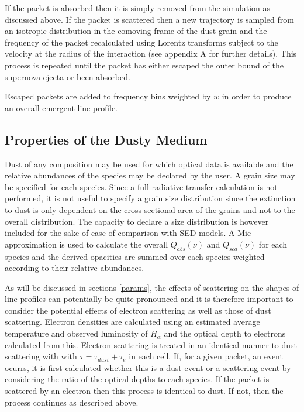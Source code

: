 \documentclass[useAMS,usenatbib,usegraphicx]{mnras}
\begin{document}
If the packet is absorbed then it is simply removed from the simulation as discussed above.  If the packet is scattered then a new trajectory is sampled from an isotropic distribution in the comoving frame of the dust grain and the frequency of the packet recalculated using Lorentz transforms subject to the velocity at the radius of the interaction (see appendix A for further details).  This process is repeated until the packet has either escaped the outer bound of the supernova ejecta or been absorbed.
   
Escaped packets are added to frequency bins weighted by $w$ in order to produce an overall emergent line profile.



\subsection{Properties of the Dusty Medium}

Dust of any composition may be used for which optical data is available and the relative abundances of the species may be declared by the user.  A grain size may be specified for each species.  Since a full radiative transfer calculation is not performed, it is not useful to specify a grain size distribution since the extinction to dust is only dependent on the cross-sectional area of the grains and not to the overall distribution.  The capacity to declare a size distribution is however included for the sake of ease of comparison with SED models.  A Mie approximation is used to calculate the overall $Q_{abs}(\nu)$ and $Q_{sca}(\nu)$ for each species and the derived opacities are summed over each species weighted according to their relative abundances. 


As will be discussed in sections \ref{params}, the effects of scattering on the shapes of line profiles can potentially be quite pronounced and it is therefore important to consider the potential effects of electron scattering as well as those of dust scattering.  Electron densities are calculated using an estimated average temperature and observed luminosity of $H_{\alpha}$ and the optical depth to electrons calculated from this.  Electron scattering is treated in an identical manner to dust scattering with with $\tau = \tau_{dust}+\tau_{e}$ in each cell.  If, for a given packet, an event ocurrs, it is first calculated whether this is a dust event or a scattering event by considering the ratio of the optical depths to each species.  If the packet is scattered by an electron then this process is identical to dust.  If not, then the process continues as described above.  
\end{document}
